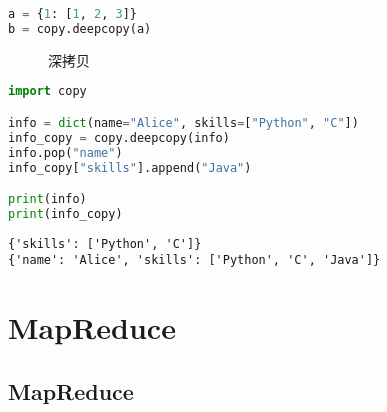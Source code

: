 \begin{lstlisting}[language=Python]
a = {1: [1, 2, 3]}
b = copy.deepcopy(a)
\end{lstlisting}

\begin{figure}[H]
    \centering
    \caption{深拷贝}
\end{figure}

\vspace{0.5cm}


\begin{lstlisting}[language=Python]
import copy

info = dict(name="Alice", skills=["Python", "C"])
info_copy = copy.deepcopy(info)
info.pop("name")
info_copy["skills"].append("Java")

print(info)
print(info_copy)
\end{lstlisting}

\begin{tcolorbox}
    \begin{verbatim}
{'skills': ['Python', 'C']}
{'name': 'Alice', 'skills': ['Python', 'C', 'Java']}
\end{verbatim}
\end{tcolorbox}

\newpage

\section{MapReduce}

\subsection{MapReduce}

